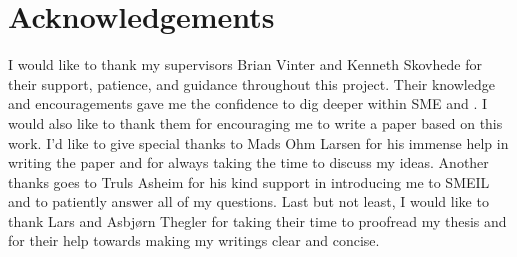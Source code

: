 \section{Acknowledgements}
I would like to thank my supervisors Brian Vinter and Kenneth Skovhede for their support, patience, and guidance throughout this project. Their knowledge and encouragements gave me the confidence to dig deeper within SME and \cspm{}. I would also like to thank them for encouraging me to write a paper based on this work.
I'd like to give special thanks to Mads Ohm Larsen for his immense help in writing the paper and for always taking the time to discuss my ideas.
Another thanks goes to Truls Asheim for his kind support in introducing me to SMEIL and to patiently answer all of my questions.
Last but not least, I would like to thank Lars and Asbj\o rn Thegler for taking their time to proofread my thesis and for their help towards making my writings clear and concise.
